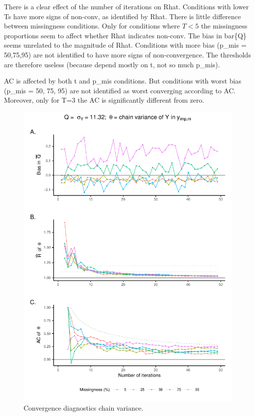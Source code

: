 \documentclass[Royal,times,sageh]{sagej}
\begin{document}
There is a clear effect of the number of iterations on Rhat. Conditions
with lower Ts have more signs of non-conv, as identified by Rhat. There
is little difference between missingness conditions. Only for conditions
where \(T<5\) the missingness proportions seem to affect whether Rhat
indicates non-conv. The bias in bar\{Q\} seems unrelated to the
magnitude of Rhat. Conditions with more bias (p\_mis = 50,75,95) are not
identified to have more signs of non-convergence. The thresholds are
therefore useless (because depend mostly on t, not so much p\_mis).

AC is affected by both t and p\_mis conditions. But conditions with
worst bias (p\_mis = 50, 75, 95) are not identified as worst converging
according to AC. Moreover, only for T=3 the AC is significantly
different from zero.

\begin{figure}

{\centering \includegraphics{manuscript_files/figure-latex/sd-1} 

}

\caption{Convergence diagnostics chain variance.}\label{fig:sd}
\end{figure}
\end{document}
